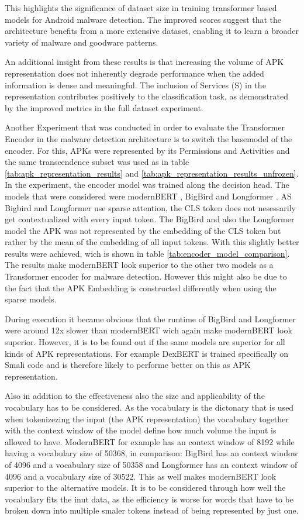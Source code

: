 This highlights the significance of dataset size in training 
transformer based models for Android malware detection. 
The improved scores suggest that the architecture benefits 
from a more extensive dataset, enabling it to learn a broader 
variety of malware and goodware patterns. 

An additional insight from these results is that increasing 
the volume of APK representation does not inherently degrade 
performance when the added information is dense and meaningful. 
The inclusion of Services (S) in the representation contributes 
positively to the classification task, as demonstrated by the 
improved metrics in the full dataset experiment.

Another Experiment that was conducted in order to evaluate the 
Transformer Encoder in the malware detection architecture is to switch
the basemodel of the encoder.
For this, APKs were represented by its Permissions and Activities
and the same transcendence subset was used as in table 
\ref{tab:apk_representation_results} and \ref{tab:apk_representation_results_unfrozen}.
In the experiment, the encoder model was trained along the decision head.
The models that were considered were modernBERT \cite{modernbert}, 
BigBird \cite{bigbird} and Longformer \cite{longformer}. AS Bigbird and
Longformer use sparse attention, the CLS token does not nesessarily get 
contextualized with every input token. The BigBird and also the Longformer model
the APK was not represented by the embedding of the CLS token but rather by the
mean of the embedding of all input tokens. With this slightly better results 
were achieved, wich is shown in table \ref{tab:encoder_model_comparison}.
The results make modernBERT look superior to the other two models as a 
Transformer encoder for malware detection. However this might also be due to 
the fact that the APK Embedding is constructed differently when using the 
sparse models.

During execution it became obvious that the runtime of BigBird and Longformer were
around 12x slower than modernBERT wich again make modernBERT look superior.
However, it is to be found out if the same models are superior for all kinds of
APK representations. For example DexBERT is trained specifically on Smali code
and is therefore likely to performe better on this as APK representation.

Also in addition to the effectiveness also the size and applicability of 
the vocabulary has to be considered. As the vocabulary is the dictonary that
is used when tokenizezing the input (the APK representation) the vocabulary 
together with the context window of the model define how much volume the
input is allowed to have. ModernBERT for example has an context window of
8192 while having a vocabulary size of 50368, in comparison: BigBird has 
an context window of 4096 and a vocabulary size of 50358 and Longformer has
an context window of 4096 and a vocabulary size of 30522. This as well makes 
modernBERT look superior to the alternative models. It is to be considered through
how well the vocabulary fits the inut data, as the efficiency is worse for 
words that have to be broken down into multiple smaler tokens instead of being
represented by just one.




